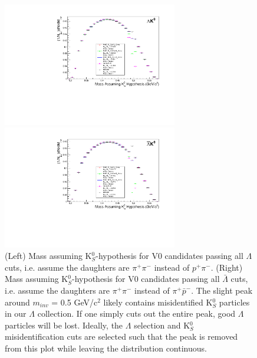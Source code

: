 \documentclass[../AnalysisNoteJBuxton.tex]{subfiles}
\begin{document}
\begin{figure}[h]
\begin{minipage}{18pc}
\includegraphics[width=18pc]{3_DataSelection/Figures/MassAssHypotheses/canMassAssK0HypCompare_LamK0_wNoMisID.pdf}
\end{minipage}\hspace{2pc}
\begin{minipage}{18pc}
\includegraphics[width=18pc]{3_DataSelection/Figures/MassAssHypotheses/canMassAssK0HypCompare_ALamK0_wNoMisID.pdf}
\end{minipage} 
\caption[K$^{0}_{S}$ contamination in $\Lambda$($\bar{\Lambda}$) collection]{(Left) Mass assuming K$^{0}_{S}$-hypothesis for V0 candidates passing all $\Lambda$ cuts, i.e. assume the daughters are $\pi^{+}\pi^{-}$ instead of $p^{+}\pi^{-}$.
(Right) Mass assuming K$^{0}_{S}$-hypothesis for V0 candidates passing all $\bar{\Lambda}$ cuts, i.e. assume the daughters are $\pi^{+}\pi^{-}$ instead of $\pi^{+}\bar{p}^{-}$.
The slight peak around $m_{inv}$ = 0.5 GeV/c$^{2}$ likely contains misidentified K$^{0}_{S}$ particles in our $\Lambda$ collection.
If one simply cuts out the entire peak, good $\Lambda$ particles will be lost.
Ideally, the $\Lambda$ selection and K$^{0}_{S}$ misidentification cuts are selected such that the peak is removed from this plot while leaving the distribution continuous.}
  \label{fig:MassAssK0ShortHyp_cLamK0}
\end{figure}
\end{document}
